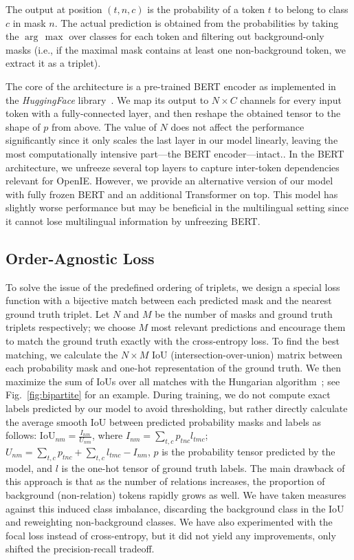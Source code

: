 \documentclass[letterpaper]{article} \usepackage{aaai22}  \usepackage{times}  \usepackage{helvet}  \usepackage{courier}  \usepackage[hyphens]{url}  \usepackage{graphicx} \usepackage{placeins}
\def\argmax{\arg\,\max}
\begin{document}
The output at position $(t, n, c)$ is the probability of a token $t$ to belong to class $c$ in mask $n$. The actual prediction is obtained from the probabilities by taking the $\argmax$ over classes for each token and filtering out background-only masks (i.e., if the maximal mask contains at least one non-background token, we extract it as a triplet). 


The core of the architecture is a pre-trained BERT encoder as implemented in the \emph{HuggingFace} library~\cite{devlin-etal-2019-bert,wolf-etal-2020-transformers}.
We map its output to $N \times C$ channels for every input token with a fully-connected layer, and then reshape the obtained tensor to the shape of $p$ from above.
The value of $N$ does not affect the performance significantly since it only scales the last layer in our model linearly, leaving the most computationally intensive part---the BERT encoder---intact..
In the BERT architecture, we unfreeze several top layers to capture inter-token dependencies relevant for OpenIE. However, we provide an alternative version of our model with fully frozen BERT and an additional Transformer on top. This model has slightly worse performance but may be beneficial in the multilingual setting since it cannot lose multilingual information by unfreezing BERT.

\subsection{Order-Agnostic Loss}

To solve the issue of the predefined ordering of triplets, we design a special loss function with a bijective match between each predicted mask and the nearest ground truth triplet. Let $N$ and $M$ be the number of masks and ground truth triplets respectively; we choose $M$ most relevant predictions and encourage them to match the ground truth exactly with the cross-entropy loss. To find the best matching, we calculate the $N \times M$ IoU (intersection-over-union) matrix between each probability mask and one-hot representation of the ground truth. We then maximize 
the sum of IoUs over all matches with the Hungarian algorithm~\cite{kuhn1955hungarian}; see Fig.~\ref{fig:bipartite} for an example.
During training, we do not compute exact labels predicted by our model to avoid thresholding, but rather directly calculate the average smooth IoU between predicted probability masks and labels as follows:
$\mathrm{IoU}_{nm} = \frac{I_{nm}}{U_{nm}}$, where
    $I_{nm} = \sum_{t,c} p_{tnc} l_{tmc}$;
    $U_{nm} = \sum_{t,c}p_{tnc} + \sum_{t,c} l_{tmc} - I_{nm}$,
$p$ is the probability tensor predicted by the model, and $l$ is the one-hot tensor of ground truth labels.
The main drawback of this approach is that as the number of relations increases, the proportion of background (non-relation) tokens rapidly grows as well. We have taken measures against this induced class imbalance, discarding the background class in the IoU and reweighting non-background classes. We have also experimented with the focal loss instead of cross-entropy, but it did not yield any improvements, only shifted the precision-recall tradeoff.
\end{document}
